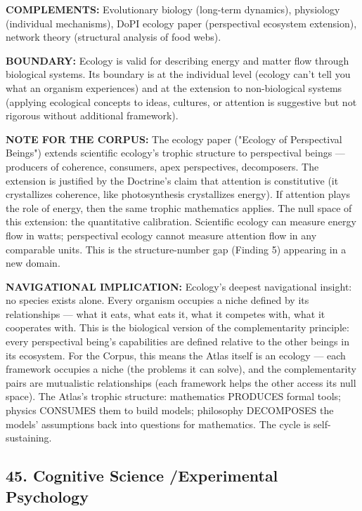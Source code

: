 \textbf{COMPLEMENTS:} Evolutionary biology (long-term dynamics), physiology (individual mechanisms), DoPI ecology paper (perspectival ecosystem extension), network theory (structural analysis of food webs).


\textbf{BOUNDARY:} Ecology is valid for describing energy and matter flow through biological systems. Its boundary is at the individual level (ecology can't tell you what an organism experiences) and at the extension to non-biological systems (applying ecological concepts to ideas, cultures, or attention is suggestive but not rigorous without additional framework).


\textbf{NOTE FOR THE CORPUS:} The ecology paper ("Ecology of Perspectival Beings") extends scientific ecology's trophic structure to perspectival beings — producers of coherence, consumers, apex perspectives, decomposers. The extension is justified by the Doctrine's claim that attention is constitutive (it crystallizes coherence, like photosynthesis crystallizes energy). If attention plays the role of energy, then the same trophic mathematics applies. The null space of this extension: the quantitative calibration. Scientific ecology can measure energy flow in watts; perspectival ecology cannot measure attention flow in any comparable units. This is the structure-number gap (Finding 5) appearing in a new domain.


\textbf{NAVIGATIONAL IMPLICATION:} Ecology's deepest navigational insight: no species exists alone. Every organism occupies a niche defined by its relationships — what it eats, what eats it, what it competes with, what it cooperates with. This is the biological version of the complementarity principle: every perspectival being's capabilities are defined relative to the other beings in its ecosystem. For the Corpus, this means the Atlas itself is an ecology — each framework occupies a niche (the problems it can solve), and the complementarity pairs are mutualistic relationships (each framework helps the other access its null space). The Atlas's trophic structure: mathematics PRODUCES formal tools; physics CONSUMES them to build models; philosophy DECOMPOSES the models' assumptions back into questions for mathematics. The cycle is self-sustaining.


\bigskip\noindent\makebox[\textwidth]{\color{rulegray}\rule{5cm}{0.3pt}}\bigskip


\subsection*{45. Cognitive Science /\allowbreak  Experimental Psychology}


